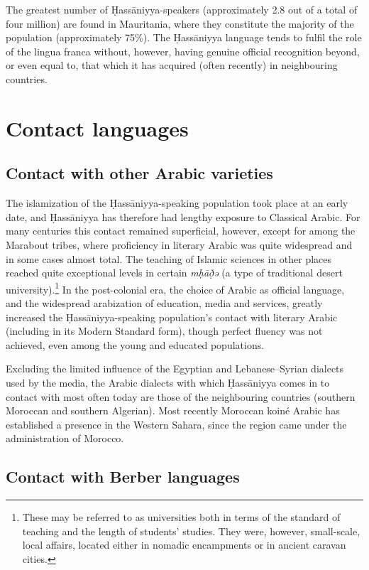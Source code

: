 \documentclass[output=paper]{langsci/langscibook}
\begin{document}
The greatest number of Ḥassāniyya-speakers (approximately 2.8 out of a total of four million) are found in Mauritania, where they constitute the majority of the population (approximately 75\%). The Ḥassāniyya language tends to fulfil the role of the lingua franca without, however, having genuine official recognition beyond, or even equal to, that which it has acquired (often recently) in neighbouring countries.

\section{Contact languages} %

\subsection{Contact with other Arabic varieties} %

The islamization of the Ḥassāniyya-speaking population took place at an early date, and Ḥassāniyya has therefore had lengthy exposure to Classical Arabic. For many centuries this contact remained superficial, however, except for among the Marabout tribes, where proficiency in literary Arabic was quite widespread and in some cases almost total. The teaching of Islamic sciences in other places reached quite exceptional levels in certain \textit{mḥāð̣ə{\R}} (a type of traditional desert university).\footnote{These may be referred to as universities both in terms of the standard of teaching and the length of students’ studies. They were, however, small-scale, local affairs, located either in nomadic encampments or in ancient caravan cities.} In the post-colonial era, the choice of Arabic as official language, and the widespread arabization of education, media and services, greatly increased the Ḥassāniyya-speaking population’s contact with literary Arabic (including in its Modern Standard form), though perfect fluency was not achieved, even among the young and educated populations. 

Excluding the limited influence of the Egyptian and Lebanese–Syrian dialects used by the media, the Arabic dialects with which Ḥassāniyya comes in to contact with most often today are those of the neighbouring countries (southern Moroccan and southern Algerian). Most recently Moroccan koiné Arabic has established a presence in the Western Sahara, since the region came under the administration of Morocco.

\subsection{Contact with Berber languages} %
\end{document}
